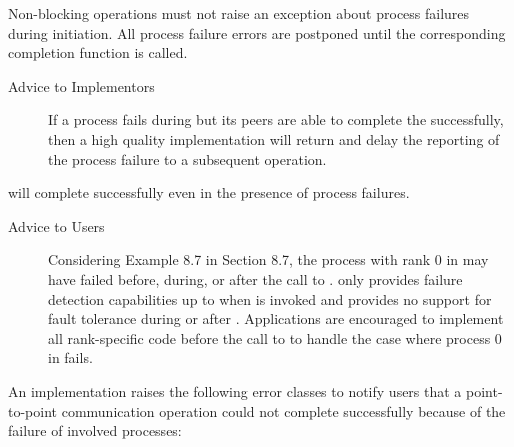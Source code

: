Non-blocking operations must not raise an exception about process failures during
initiation. All process failure errors are postponed until the corresponding
completion function is called.

\label{sec:ft-notification:init-finalize}

\begin{description}

\item[Advice to Implementors] {If a process fails during
 but its peers are able to complete the  
successfully, then a high quality implementation will 
return  and delay the reporting of the process failure 
to a subsequent \mpi operation.}

\end{description}

 will complete successfully even in the presence of process failures.


\begin{description}

\item[Advice to Users] {Considering Example 8.7 in Section 8.7, 
the process with rank 0 in  may have failed before, 
during, or after the call to .
\mpi only provides failure detection capabilities up to when 
 is invoked and provides no support for fault tolerance 
during or after . Applications are encouraged to implement 
all rank-specific code before the call to  
to handle the case where process 0 in  fails.}

\end{description}

\label{sec:ft-notification:p2p-coll-comm}

An \mpi implementation raises the following error classes to notify
users that a point-to-point communication operation could not complete
successfully because of the failure of involved processes:

